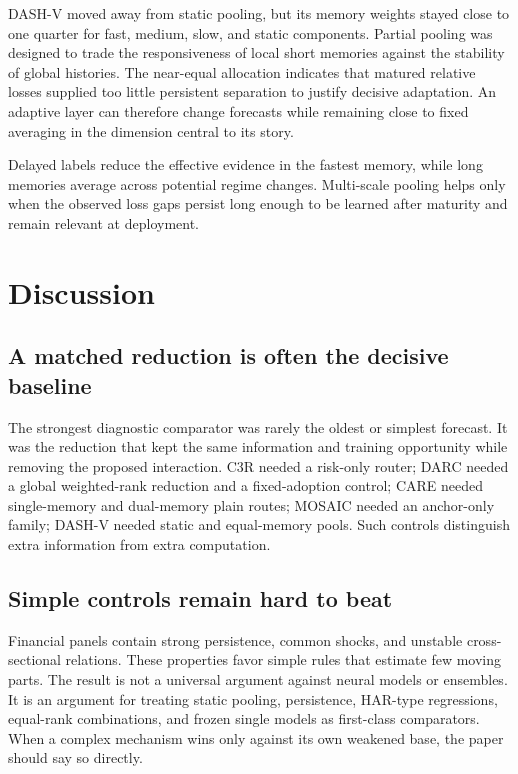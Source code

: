 \documentclass{crebss}
\begin{document}
DASH-V moved away from static pooling, but its memory weights stayed close to one quarter for fast, medium, slow, and static components. Partial pooling was designed to trade the responsiveness of local short memories against the stability of global histories. The near-equal allocation indicates that matured relative losses supplied too little persistent separation to justify decisive adaptation. An adaptive layer can therefore change forecasts while remaining close to fixed averaging in the dimension central to its story.

Delayed labels reduce the effective evidence in the fastest memory, while long memories average across potential regime changes. Multi-scale pooling helps only when the observed loss gaps persist long enough to be learned after maturity and remain relevant at deployment.

\section{Discussion}

\subsection{A matched reduction is often the decisive baseline}

The strongest diagnostic comparator was rarely the oldest or simplest forecast. It was the reduction that kept the same information and training opportunity while removing the proposed interaction. C3R needed a risk-only router; DARC needed a global weighted-rank reduction and a fixed-adoption control; CARE needed single-memory and dual-memory plain routes; MOSAIC needed an anchor-only family; DASH-V needed static and equal-memory pools. Such controls distinguish extra information from extra computation.

\subsection{Simple controls remain hard to beat}

Financial panels contain strong persistence, common shocks, and unstable cross-sectional relations. These properties favor simple rules that estimate few moving parts. The result is not a universal argument against neural models or ensembles. It is an argument for treating static pooling, persistence, HAR-type regressions, equal-rank combinations, and frozen single models as first-class comparators. When a complex mechanism wins only against its own weakened base, the paper should say so directly.
\end{document}
